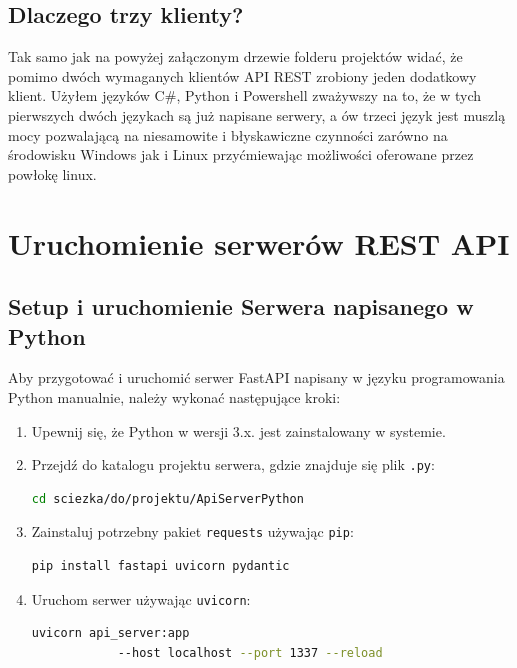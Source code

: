 \subsection{Dlaczego trzy klienty?}
\begin{spacing}{1.5} %
    Tak samo jak na powyżej załączonym drzewie folderu projektów widać, że pomimo dwóch wymaganych klientów API REST zrobiony jeden dodatkowy klient. Użyłem języków C\#, Python i Powershell zważywszy na to, że w tych pierwszych dwóch językach są już napisane serwery, a ów trzeci język jest muszlą mocy pozwalającą na niesamowite i błyskawiczne czynności zarówno na środowisku Windows jak i Linux przyćmiewając możliwości oferowane przez powłokę linux.
\end{spacing} %

\section{Uruchomienie serwerów REST API}

\subsection{Setup i uruchomienie Serwera napisanego w Python}
\begin{spacing}{1.5} %
\end{spacing} %
    Aby przygotować i uruchomić serwer FastAPI napisany w języku programowania Python manualnie, należy wykonać następujące kroki:
    \begin{enumerate}
        \item Upewnij się, że Python w wersji 3.x. jest zainstalowany w systemie.
        \item Przejdź do katalogu projektu serwera, gdzie znajduje się plik \texttt{.py}:
        \begin{lstlisting}[language=bash]
    cd sciezka/do/projektu/ApiServerPython
        \end{lstlisting}
        \item Zainstaluj potrzebny pakiet \texttt{requests} używając \texttt{pip}:
        \begin{lstlisting}[language=bash]
    pip install fastapi uvicorn pydantic
        \end{lstlisting}
        \item Uruchom serwer używając \texttt{uvicorn}:
        \begin{lstlisting}[language=bash]
        uvicorn api_server:app 
            --host localhost --port 1337 --reload
        \end{lstlisting}
    \end{enumerate}


